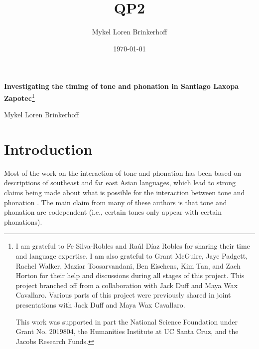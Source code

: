\documentclass[12pt, letterpaper]{article}
\title{QP2}
\author{Mykel Loren Brinkerhoff}
\date{\today}
\begin{document}
	
	
	\onehalfspacing
	
\begin{center}
	{\Large \textbf{Investigating the timing of tone and phonation in Santiago Laxopa Zapotec}}\footnote{I am grateful to Fe Silva-Robles and  Raúl Díaz Robles for sharing their time and language expertise. I am also grateful to Grant McGuire,  Jaye Padgett, Rachel Walker, Maziar Toosarvandani, Ben Eischens, Kim Tan, and Zach Horton for their help and discussions during all stages of this project. This project branched off from a collaboration with  Jack Duff and Maya Wax Cavallaro. Various parts of this project were previously shared in joint presentations with Jack Duff and Maya Wax Cavallaro.
	
	This work was supported in part the National Science Foundation under Grant No. 2019804, the Humanities Institute at UC Santa Cruz, and the Jacobs Research Funds.}
	\vspace{6pt}

	Mykel Loren Brinkerhoff
\end{center}
\thispagestyle{fancy}



\section{Introduction} \label{sec:Introduction}

Most of the work on the interaction of tone and phonation has been based on descriptions of southeast and far east Asian languages, which lead to strong claims being made about what is possible for the interaction between tone and phonation \citep{masicaDefiningLinguisticArea1976,thurgoodVietnameseTonogenesisRevising2002,yipTone2002,enfieldArealLinguisticsMainland2005,michaudComplexTonesEast2012,brunelleTonePhonationSoutheast2016}. The main claim from many of these authors is that tone and phonation are codependent (i.e., certain tones only appear with certain phonations).
\end{document}
